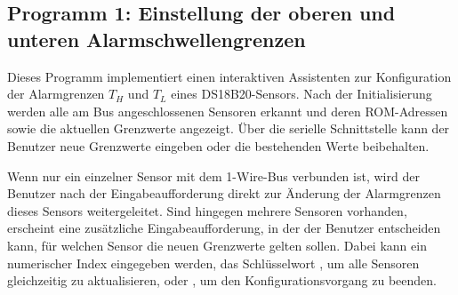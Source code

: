 	{
	}
	
	{
	}
	
	{
	}
	
	{
	}
	
	{
	}
	
	{
	}
	
	{
	}
	
	
	
\subsection{Programm 1: Einstellung der oberen und unteren Alarmschwellengrenzen}
	Dieses Programm implementiert einen interaktiven Assistenten zur Konfiguration der Alarmgrenzen $T_H$ und $T_L$ eines DS18B20-Sensors. Nach der Initialisierung werden alle am Bus angeschlossenen Sensoren erkannt und deren ROM-Adressen sowie die aktuellen Grenzwerte angezeigt. Über die serielle Schnittstelle kann der Benutzer neue Grenzwerte eingeben oder die bestehenden Werte beibehalten. 
	
	Wenn nur ein einzelner Sensor mit dem 1-Wire-Bus verbunden ist, wird der Benutzer nach der Eingabeaufforderung direkt zur Änderung der Alarmgrenzen dieses Sensors weitergeleitet. Sind hingegen mehrere Sensoren vorhanden, erscheint eine zusätzliche Eingabeaufforderung, in der der Benutzer entscheiden kann, für welchen Sensor die neuen Grenzwerte gelten sollen. Dabei kann ein numerischer Index eingegeben werden, das Schlüsselwort , um alle Sensoren gleichzeitig zu aktualisieren, oder , um den Konfigurationsvorgang zu beenden.
	
